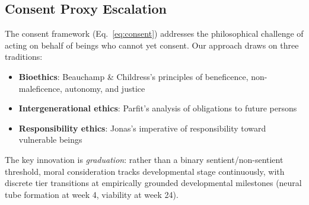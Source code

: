 \documentclass[11pt,letterpaper]{article}
\begin{document}
\subsection{Consent Proxy Escalation}

The consent framework (Eq.~\ref{eq:consent}) addresses the philosophical
challenge of acting on behalf of beings who cannot yet consent. Our approach
draws on three traditions:

\begin{itemize}[nosep,leftmargin=2em]
\item \textbf{Bioethics}: Beauchamp \& Childress's \cite{beauchamp2019principles}
  principles of beneficence, non-maleficence, autonomy, and justice
\item \textbf{Intergenerational ethics}: Parfit's \cite{parfit1984reasons}
  analysis of obligations to future persons
\item \textbf{Responsibility ethics}: Jonas's \cite{jonas1984imperative}
  imperative of responsibility toward vulnerable beings
\end{itemize}

The key innovation is \emph{graduation}: rather than a binary
sentient/non-sentient threshold, moral consideration tracks developmental stage
continuously, with discrete tier transitions at empirically grounded
developmental milestones (neural tube formation at week 4, viability at week 24).
\end{document}
